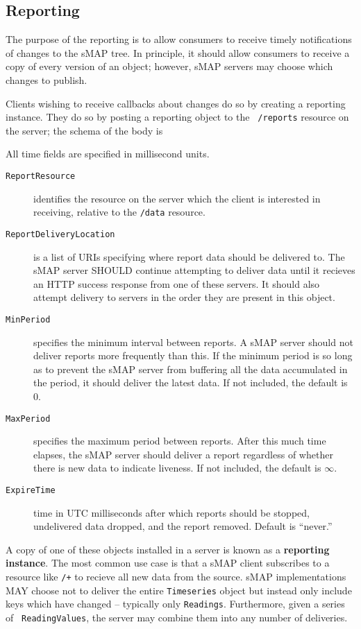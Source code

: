 \documentclass[10pt,letterpaper]{article}
\newcommand{\smap}{sMAP}
\begin{document}
\subsection{Reporting}
The purpose of the reporting is to allow consumers to receive timely
notifications of changes to the \smap{} tree.  In principle, it should allow
consumers to receive a copy of every version of an object; however, \smap{}
servers may choose which changes to publish.

Clients wishing to receive callbacks about changes do so by creating a
reporting instance.  They do so by posting a reporting object to the {\tt
  /reports} resource on the server; the schema of the body is 


% 
All time fields are specified in millisecond units.  
\begin{description}
\item [{\tt ReportResource}] identifies the resource on the server which the
  client is interested in receiving, relative to the {\tt /data} resource.
\item[{\tt ReportDeliveryLocation}] is a list of URIs specifying where report
  data should be delivered to.  The \smap{} server SHOULD continue attempting
  to deliver data until it recieves an HTTP success response from one of these
  servers.  It should also attempt delivery to servers in the order they are
  present in this object.
\item[{\tt MinPeriod}] specifies the minimum interval between reports.  A
  \smap{} server should not deliver reports more frequently than this.  If the
  minimum period is so long as to prevent the \smap{} server from buffering
  all the data accumulated in the period, it should deliver the latest data.
  If not included, the default is $0$.
\item[{\tt MaxPeriod}] specifies the maximum period between reports.  After
  this much time elapses, the \smap{} server should deliver a report
  regardless of whether there is new data to indicate liveness.  If not
  included, the default is $\infty$.
\item[{\tt ExpireTime}] time in UTC milliseconds after which reports should be
  stopped, undelivered data dropped, and the report removed.  Default is
  ``never.''
\end{description}

A copy of one of these objects installed in a server is known as a {\bf
  reporting instance}. The most common use case is that a \smap{} client
subscribes to a resource like {\tt /+} to recieve all new data
from the source.  \smap{} implementations MAY choose not to deliver the entire
{\tt Timeseries} object but instead only include keys which have changed --
typically only {\tt Readings}.  Furthermore, given a series of {\tt
  ReadingValues}, the server may combine them into any number of deliveries.
\end{document}
